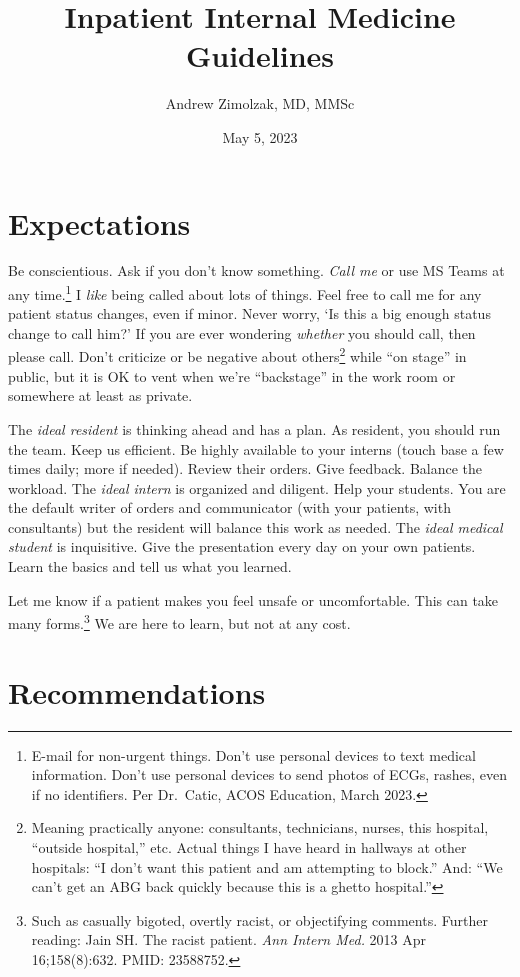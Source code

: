 \documentclass{tufte-handout}
\title{Inpatient Internal Medicine Guidelines}
\author{Andrew Zimolzak, MD, MMSc}
\date{May 5, 2023}
\begin{document}
\maketitle

\section{Expectations}

Be conscientious. Ask if you don't know something. \emph{Call me} or
use MS Teams at any time.\footnote{E-mail for non-urgent things. Don't
use personal devices to text medical information. Don't use personal
devices to send photos of ECGs, rashes, even if no identifiers. Per
Dr.\ Catic, ACOS Education, March 2023.} I \emph{like} being called
about lots of things. Feel free to call me for any patient status
changes, even if minor. Never worry, `Is this a big enough status
change to call him?' If you are ever wondering \emph{whether} you
should call, then please call. Don't criticize or be negative about
others\footnote{Meaning practically anyone: consultants, technicians,
nurses, this hospital, ``outside hospital,'' etc. Actual things I have
heard in hallways at other hospitals: ``I don't want this patient and
am attempting to block.'' And: ``We can't get an ABG back quickly
because this is a ghetto hospital.''} while ``on stage'' in public,
but it is OK to vent when we're ``backstage'' in the work room or
somewhere at least as private.

The \emph{ideal resident} is thinking ahead and has a plan. As
resident, you should run the team. Keep us efficient. Be highly
available to your interns (touch base a few times daily; more if
needed). Review their orders. Give feedback. Balance the workload. The
\emph{ideal intern} is organized and diligent. Help your students. You
are the default writer of orders and communicator (with your patients,
with consultants) but the resident will balance this work as needed.
The \emph{ideal medical student} is inquisitive. Give the presentation
every day on your own patients. Learn the basics and tell us what you
learned.

Let me know if a patient makes you feel unsafe or uncomfortable. This
can take many forms.\footnote{Such as casually bigoted, overtly
racist, or objectifying comments. Further reading: Jain SH. The racist
patient. \emph{Ann Intern Med.} 2013 Apr 16;158(8):632. PMID:
23588752.} We are here to learn, but not at any cost.



\section{Recommendations}
\end{document}
